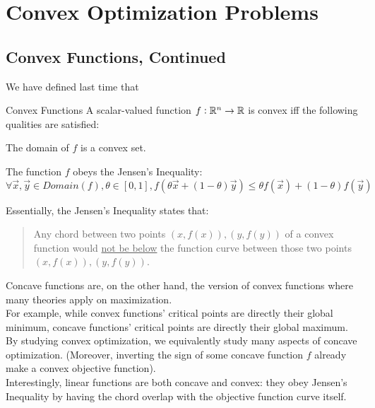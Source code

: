 \chapter{Convex Optimization Problems}

\section{Convex Functions, Continued}
We have defined last time that
\begin{ln-define}{Convex Functions}{}
    A scalar-valued function $f: \mathbb{R}^n \rightarrow \mathbb{R}$ is convex iff the following qualities are satisfied:
    \begin{bindenum}
        \item The domain of $f$ is a convex set.
        \item The function $f$ obeys the Jensen's Inequality:
        \[
            \forall \vec{x}, \vec{y} \in Domain(f), \theta \in [0, 1], f(\theta \vec{x} + (1 - \theta) \vec{y}) \leq \theta f(\vec{x}) + (1 - \theta) f(\vec{y})
        \]
    \end{bindenum}
    Essentially, the Jensen's Inequality states that:
    \begin{quote}
        Any chord between two points $(x, f(x)), (y, f(y))$ of a convex function would \underline{not be below} the function curve between those two points $(x, f(x)), (y, f(y))$.
    \end{quote}
\end{ln-define}
Concave functions are, on the other hand, the version of convex functions where many theories apply on maximization. \\
For example, while convex functions' critical points are directly their global minimum, concave functions' critical points are directly their global maximum. \\
By studying convex optimization, we equivalently study many aspects of concave optimization.
(Moreover, inverting the sign of some concave function $f$ already make a convex objective function). \\
Interestingly, linear functions are both concave and convex: they obey Jensen's Inequality by having the chord overlap with the objective function curve itself.

